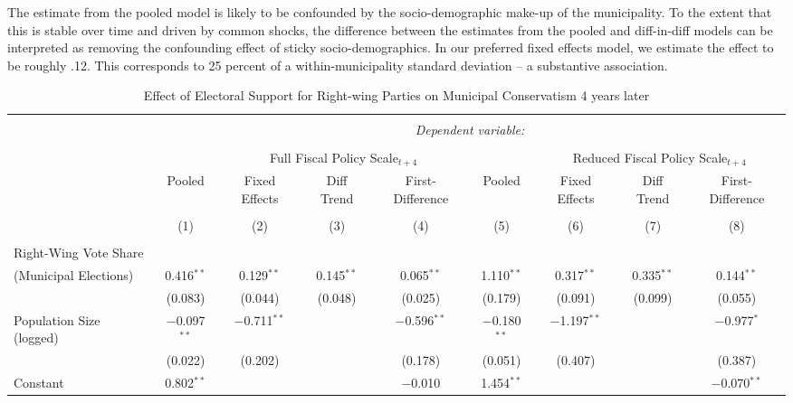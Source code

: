 \documentclass[a4paper,12pt]{article}
\begin{document}
The estimate from the pooled model is likely to be confounded by the socio-demographic make-up of the municipality. To the extent that this is stable over time and driven by common shocks, the difference between the estimates from the pooled and diff-in-diff models can be interpreted as removing the confounding effect of sticky socio-demographics. In our preferred fixed effects model, we estimate the effect to be roughly .12. This corresponds to 25 percent of a within-municipality standard deviation -- a substantive association. 


\begin{landscape}
	
	
	\begin{table}[!htbp] \centering 
		\caption{Effect of Electoral Support for Right-wing Parties on Municipal Conservatism 4 years later} 
		\label{tab:FourYearLead} 
		\begin{tabular}{@{\extracolsep{5pt}}lcccccccc} 
			\\[-1.8ex]\hline 
			\hline \\[-1.8ex] 
			& \multicolumn{8}{c}{\textit{Dependent variable:}} \\ 
			\cline{2-9} 
			\\[-1.8ex] & & \multicolumn{3}{c}{Full Fiscal Policy Scale$_{t+4}$} & 	&\multicolumn{3}{c}{Reduced Fiscal Policy Scale$_{t+4}$}   \\ 
			& Pooled & Fixed Effects & Diff Trend & First-Difference & Pooled & Fixed Effects & Diff Trend & First-Difference \\ 
			\\[-1.8ex] & (1) & (2) & (3) & (4) & (5) & (6) & (7) & (8)\\ 
			\hline \\[-1.8ex] 
		Right-Wing Vote Share\\(Municipal Elections)  & 0.416$^{**}$ & 0.129$^{**}$ & 0.145$^{**}$ & 0.065$^{**}$  & 1.110$^{**}$ & 0.317$^{**}$ & 0.335$^{**}$ & 0.144$^{**}$ \\ 
			& (0.083) & (0.044) & (0.048) & (0.025)  & (0.179) & (0.091) & (0.099) &  (0.055) \\ 
			Population Size (logged) & $-$0.097$^{**}$ & $-$0.711$^{**}$ &  & $-$0.596$^{**}$  & $-$0.180$^{**}$ & $-$1.197$^{**}$ &  & $-$0.977$^{*}$ \\ 
			& (0.022) & (0.202) &  & (0.178)  & (0.051) & (0.407) &  &  (0.387) \\ 
			Constant & 0.802$^{**}$ &  &  & $-$0.010 & 1.454$^{**}$ &  &  & $-$0.070$^{**}$ \\ 

\end{tabular}
\end{table}
\end{landscape}
\end{document}
